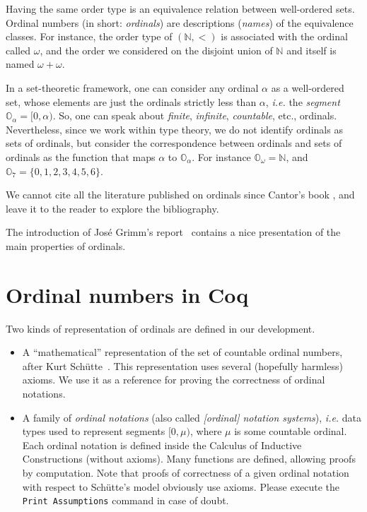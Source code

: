 Having the same order type is an equivalence relation between well-ordered sets. Ordinal numbers (in short: \emph{ordinals})  are descriptions (\emph{names}) of the equivalence classes.
For instance, the order type of $(\mathbb{N},<)$ is associated with the ordinal called  $\omega$, and the order we considered on 
the disjoint union of $\mathbb{N}$ and itself is named $\omega+\omega$.

In a set-theoretic framework, one can consider any ordinal $\alpha$ as a well-ordered set, whose  elements are just the ordinals strictly less than $\alpha$, \emph{i.e.} the \emph{segment} $\mathbb{O}_\alpha=[0, \alpha)$. So, one can speak about \emph{finite}, \emph{infinite}, \emph{countable}, etc., ordinals. Nevertheless, since we work within type theory, 
we do not identify ordinals as sets of ordinals, but consider the correspondence between ordinals and sets of ordinals as the function that maps $\alpha$ to $\mathbb{O}_\alpha$.
For instance $\mathbb{O}_\omega=\mathbb{N}$, and $\mathbb{O}_7=\{0,1,2,3,4,5,6\}$.


We cannot cite all the literature published on ordinals since Cantor's book
\cite{cantorbook}, and 
leave it to the reader to explore the bibliography.

The introduction of Jos\'e Grimm's report~\cite{grimm:hal-00911710} contains a nice presentation of the main properties of ordinals.


\section{Ordinal numbers in Coq}

Two kinds of representation of ordinals are defined in our development.

\begin{itemize}
\item A ``mathematical'' representation of the set of countable ordinal numbers, after Kurt Schütte~\cite{schutte}. This representation uses several (hopefully harmless) axioms. We use it as a reference for proving the correctness of ordinal notations.
\item A family of \emph{ordinal notations} (also called \emph{[ordinal] notation systems}), \emph{i.e.} data types used to represent segments $[0,\mu)$, where $\mu$ is some countable ordinal. Each ordinal notation is defined inside the Calculus of Inductive Constructions (without axioms). Many functions are defined, allowing proofs by computation. Note that proofs of 
correctness of a given ordinal notation with respect to Schütte's model obviously use axioms.
Please execute the \texttt{Print Assumptions} command in case of doubt.
\end{itemize}

